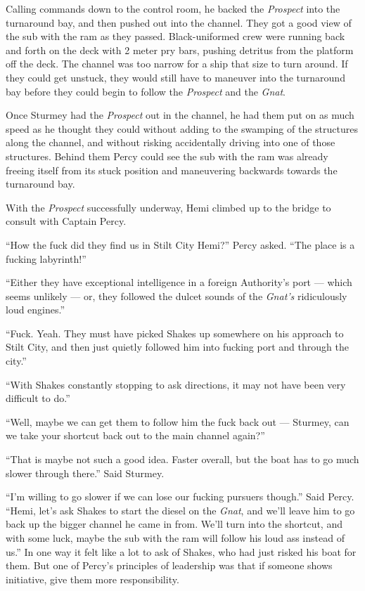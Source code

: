 \documentclass[]{scrbook}
\begin{document}
Calling commands down to the control room, he backed the \emph{Prospect}
into the turnaround bay, and then pushed out into the channel. They got
a good view of the sub with the ram as they passed. Black-uniformed crew
were running back and forth on the deck with 2 meter pry bars, pushing
detritus from the platform off the deck. The channel was too narrow for
a ship that size to turn around. If they could get unstuck, they would
still have to maneuver into the turnaround bay before they could begin
to follow the \emph{Prospect} and the \emph{Gnat}.

Once Sturmey had the \emph{Prospect} out in the channel, he had them put
on as much speed as he thought they could without adding to the swamping
of the structures along the channel, and without risking accidentally
driving into one of those structures. Behind them Percy could see the
sub with the ram was already freeing itself from its stuck position and
maneuvering backwards towards the turnaround bay.

With the \emph{Prospect} successfully underway, Hemi climbed up to the
bridge to consult with Captain Percy.

``How the fuck did they find us in Stilt City Hemi?'' Percy asked. ``The
place is a fucking labyrinth!''

``Either they have exceptional intelligence in a foreign Authority's
port --- which seems unlikely --- or, they followed the dulcet sounds of
the \emph{Gnat's} ridiculously loud engines.''

``Fuck. Yeah. They must have picked Shakes up somewhere on his approach
to Stilt City, and then just quietly followed him into fucking port and
through the city.''

``With Shakes constantly stopping to ask directions, it may not have
been very difficult to do.''

``Well, maybe we can get them to follow him the fuck back out ---
Sturmey, can we take your shortcut back out to the main channel again?''

``That is maybe not such a good idea. Faster overall, but the boat has
to go much slower through there.'' Said Sturmey.

``I'm willing to go slower if we can lose our fucking pursuers though.''
Said Percy. ``Hemi, let's ask Shakes to start the diesel on the
\emph{Gnat}, and we'll leave him to go back up the bigger channel he
came in from. We'll turn into the shortcut, and with some luck, maybe
the sub with the ram will follow his loud ass instead of us.'' In one
way it felt like a lot to ask of Shakes, who had just risked his boat
for them. But one of Percy's principles of leadership was that if
someone shows initiative, give them more responsibility.
\end{document}
